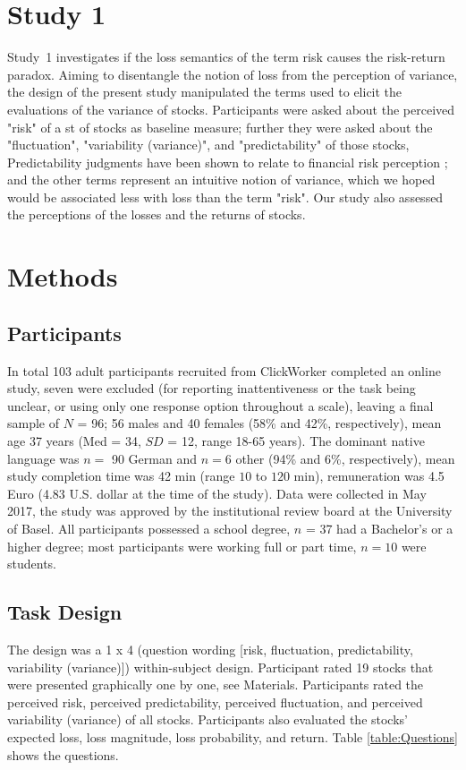 \documentclass[a4paper,man, natbib,floatsintext]{apa6} %
\begin{document}
\section{Study 1}
Study~1 investigates if the loss semantics of the term risk causes the risk-return paradox. Aiming to disentangle the notion of loss from the perception of variance, the design of the present study manipulated the terms used to elicit the evaluations of the variance of stocks. Participants were asked about the perceived "risk" of a st of stocks as baseline measure; further they were asked about the "fluctuation", "variability (variance)", and "predictability" of those stocks, Predictability judgments have been shown to relate to financial risk perception \citep{Sachse2012}; and the other terms represent an intuitive notion of variance, which we hoped would be associated less with loss than the term "risk". Our study also assessed the perceptions of the losses and the returns of stocks.

\section{Methods}
\subsection{Participants}
In total 103 adult participants recruited from ClickWorker completed an online study, seven were excluded (for reporting inattentiveness or the task being unclear, or using only one response option throughout a scale), leaving a final sample of $N$ = 96; 56 males and 40 females (58\% and 42\%, respectively), mean age 37 years (Med = 34, $SD$ = 12, range 18-65 years). The dominant native language was $n =$ 90 German and $n=6$ other (94\% and 6\%, respectively), mean study completion time was 42 min (range $10$ to $120$ min), remuneration was 4.5 Euro (4.83 U.S. dollar at the time of the study). Data were collected in May 2017, the study was approved by the institutional review board at the University of Basel. All participants possessed a school degree, $n$ = 37 had a Bachelor’s or a higher degree; most participants were working full or part time, $n=10$ were students.

\subsection{Task Design}
The design was a 1 x 4 (question wording [risk, fluctuation, predictability, variability (variance)]) within-subject design. Participant rated 19 stocks that were presented graphically one by one, see Materials. Participants rated the perceived risk, perceived predictability, perceived  fluctuation, and perceived variability (variance) of all stocks. Participants also evaluated the stocks' expected loss, loss magnitude, loss probability, and return. Table \ref{table:Questions} shows the questions.
\end{document}
